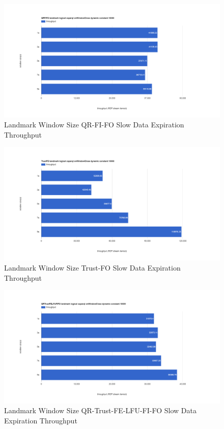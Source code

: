 \begin{figure}[!htbp]
    \centering
    \includegraphics[width=\textwidth]{img/app3-land-ws-qrfifo-slow-t.png}
    \caption{Landmark Window Size QR-FI-FO Slow Data Expiration Throughput}
\end{figure}
\begin{figure}[!htbp]
    \centering
    \includegraphics[width=\textwidth]{img/app3-land-ws-trustfo-slow-t.png}
    \caption{Landmark Window Size Trust-FO Slow Data Expiration Throughput}
\end{figure}
\begin{figure}[!htbp]
    \centering
    \includegraphics[width=\textwidth]{img/app3-land-ws-qrtrustfelfufifo-slow-t.png}
    \caption{Landmark Window Size QR-Trust-FE-LFU-FI-FO Slow Data Expiration Throughput}
\end{figure}

